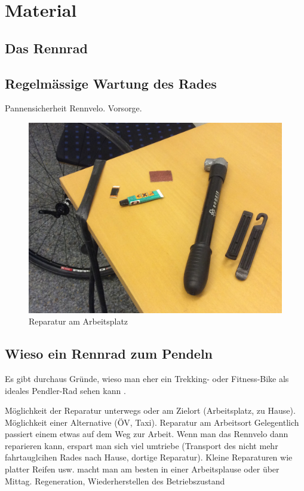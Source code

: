 \chapter{Material}
\section{Das Rennrad}

\section{Regelmässige Wartung des Rades}
Pannensicherheit Rennvelo. Vorsorge.
\begin{figure}[htpb]
        \centering
        \includegraphics[width=\textwidth]{figures/reparatur-arbeitsplatz.jpg}
        \caption{Reparatur am Arbeitsplatz}
        \label{fig:reparatur-arbeitsplatz}
\end{figure}


\section{Wieso ein Rennrad zum Pendeln}

Es gibt durchaus Gründe, wieso man eher ein Trekking- oder Fitness-Bike als ideales Pendler-Rad sehen kann \cite{Lindthaler2015perfektesfahrradpendler}.



Möglichkeit der Reparatur unterwegs oder am Zielort (Arbeitsplatz, zu Hause). Möglichkeit einer Alternative (ÖV, Taxi).
Reparatur am Arbeitsort
Gelegentlich passiert einem etwas auf dem Weg zur Arbeit. Wenn man das Rennvelo dann reparieren kann, erspart man sich viel umtriebe (Transport des nicht mehr fahrtauglcihen Rades nach Hause, dortige Reparatur). Kleine Reparaturen wie platter Reifen usw. macht man am besten in einer Arbeitsplause oder über Mittag.
Regeneration, Wiederherstellen des Betriebszustand

